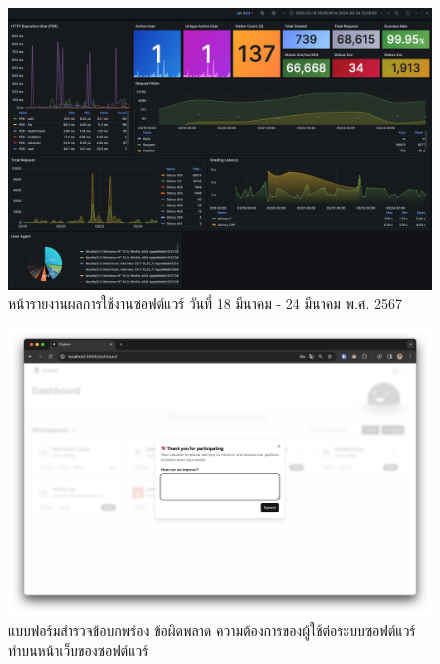 \documentclass[12pt,one side,openright,a4paper]{cpe-thesis-th}
\begin{document}
\begin{figure}[H]
  \centering
  \includegraphics[width=15cm]{figure/results/grafana/grafana-mar18-mar24.png}
  \caption[หน้ารายงานผลการใช้งานซอฟต์แวร์ วันที่ 18 มีนาคม - 24 มีนาคม พ.ศ. 2567]{หน้ารายงานผลการใช้งานซอฟต์แวร์ วันที่ 18 มีนาคม - 24 มีนาคม พ.ศ. 2567}
  \label{fig:res-grafana-m18m24}
\end{figure}

\pagebreak
{}

\begin{figure}[H]
  \centering
  \includegraphics[width=15cm]{figure/results/forms/survey-web-old.png}
  \caption[แบบฟอร์มสำรวจข้อบกพร่อง ข้อผิดพลาด ความต้องการของผู้ใช้ต่อระบบซอฟต์แวร์]{แบบฟอร์มสำรวจข้อบกพร่อง ข้อผิดพลาด ความต้องการของผู้ใช้ต่อระบบซอฟต์แวร์ ทำบนหน้าเว็บของซอฟต์แวร์}
\end{figure}
\end{document}
